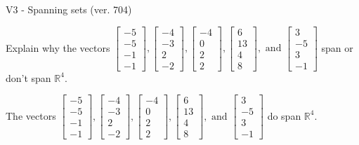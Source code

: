 \begin{exercise}
  \begin{exerciseTitle}V3 - Spanning sets (ver. 704)\end{exerciseTitle}
  \begin{exerciseStatement}
    Explain why the vectors \(\left[\begin{array}{r}
-5 \\
-5 \\
-1 \\
-1
\end{array}\right] , \left[\begin{array}{r}
-4 \\
-3 \\
2 \\
-2
\end{array}\right] , \left[\begin{array}{r}
-4 \\
0 \\
2 \\
2
\end{array}\right] , \left[\begin{array}{r}
6 \\
13 \\
4 \\
8
\end{array}\right] , \text{ and } \left[\begin{array}{r}
3 \\
-5 \\
3 \\
-1
\end{array}\right]\) span or don't span \(\mathbb{R}^4\). 
	


  \end{exerciseStatement}
  \begin{exerciseAnswer}
   The vectors \(\left[\begin{array}{r}
-5 \\
-5 \\
-1 \\
-1
\end{array}\right] , \left[\begin{array}{r}
-4 \\
-3 \\
2 \\
-2
\end{array}\right] , \left[\begin{array}{r}
-4 \\
0 \\
2 \\
2
\end{array}\right] , \left[\begin{array}{r}
6 \\
13 \\
4 \\
8
\end{array}\right] , \text{ and } \left[\begin{array}{r}
3 \\
-5 \\
3 \\
-1
\end{array}\right]\) 
  	 do  
	span \(\mathbb{R}^4\).
  



\end{exerciseAnswer}
\end{exercise}

